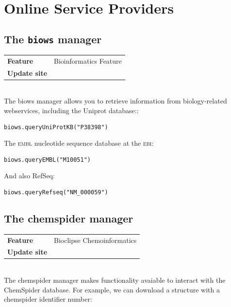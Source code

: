 \documentclass[a5paper, 10pt]{memoir}
\begin{document}
\chapter{Online Service Providers}
\begin{refsection}

\section{The \texttt{biows} manager}

\begin{tabular}{ll}
\textbf{Feature} & Bioinformatics Feature \\
\textbf{Update site} & \url{} \\
\end{tabular} \\

\noindent
The biows manager allows you to retrieve information from biology-related
webservices, including the Uniprot
database::

\begin{Verbatim}
biows.queryUniProtKB("P38398")
\end{Verbatim}
The \textsc{embl} nucleotide sequence database at the \textsc{ebi}:

\begin{Verbatim}
biows.queryEMBL("M10051")
\end{Verbatim}
And also RefSeq:

\begin{Verbatim}
biows.queryRefseq("NM_000059")
\end{Verbatim}

\section{The chemspider manager}

\begin{tabular}{ll}
\textbf{Feature} & Bioclipse Chemoinformatics \\
\textbf{Update site} & \url{} \\
\end{tabular} \\

\noindent
The chemspider manager makes functionality avaiable to interact with the
ChemSpider database. For example, we can download a structure
with a chemspider identifier number:


\end{refsection}
\end{document}
